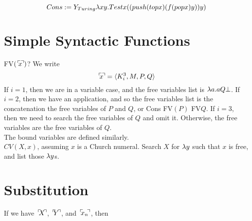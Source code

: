 \begin{equation*}
  Cons := Y_{Turing}\lambda xy.Test x((push(top x)(f (pop x)y))y)
\end{equation*}

\section{Simple Syntactic Functions}
FV$(\godnum{x})$? We write 
\begin{equation*}
  \godnum{x} = \langle K_i^3, M, P, Q \rangle
\end{equation*}
If $i = 1$, then we are in a variable case, and the free variables list is $\lambda a.aQ\bot$. If $i = 2$, then we have an application, and so the free variables list is the concatenation the free variables of $P$ and $Q$, or Cons FV$(P)$ FV$Q$. If $i = 3$, then we need to search the free variables of $Q$ and omit it. Otherwise, the free variables are the free variables of $Q$.\\

The bound variables are defined similarly.\\

$CV(X,x)$, assuming $x$ is a Church numeral. Search $X$ for $\lambda y$ such that $x$ is free, and list those $\lambda y$s.

\section{Substitution}
If we have $\godnum{X}$, $\godnum{Y}$, and $\godnum{x_n}$, then 